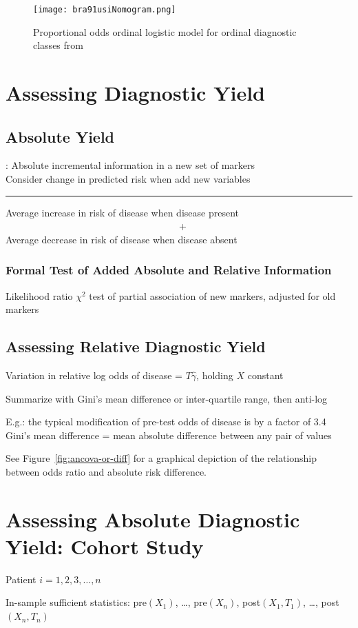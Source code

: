 \begin{figure}[!htbp]\leavevmode%
\centerline{\texttt{[image: bra91usiNomogram.png]}}
\caption{Proportional odds ordinal logistic model for ordinal diagnostic classes from~\citet{bra91usi}}
\end{figure}
\clearpage

\section{Assessing Diagnostic Yield}
\subsection{Absolute Yield}
\citet{pen08eva}: Absolute incremental information in a new set of
markers\\
Consider change in predicted risk when add new variables\\
\bigskip
\hrule
\medskip
Average increase in risk of disease when disease present\\~~~~~~~~~~~~~~~~~~~~~~~~~~~~~~~~~~~~+\\
Average decrease in risk of disease when disease absent\\
\medskip

\subsubsection{Formal Test of Added Absolute and Relative Information}
Likelihood ratio $\chi^{2}$ test of partial association
of new markers, adjusted for old markers

\subsection{Assessing Relative Diagnostic Yield}
\bi
\item Variation in relative log odds of disease = $T \hat{\gamma}$,
holding $X$ constant
\item Summarize with Gini's mean difference or inter-quartile range,
then anti-log
\item E.g.: the typical modification of pre-test odds of disease is by
a factor of 3.4
\ei
{\smaller Gini's mean difference = mean absolute difference between any
pair of values}

See Figure~\ref{fig:ancova-or-diff} for a graphical depiction of the relationship between odds ratio and absolute risk difference.

\section{Assessing Absolute Diagnostic Yield: Cohort Study}
\bi
\item Patient $i = 1, 2, 3, \ldots, n$
\item In-sample sufficient statistics: pre$(X_{1})$, \ldots,
pre$(X_{n})$, post$(X_{1}, T_{1})$, \ldots, post$(X_{n}, T_{n})$
\ei

